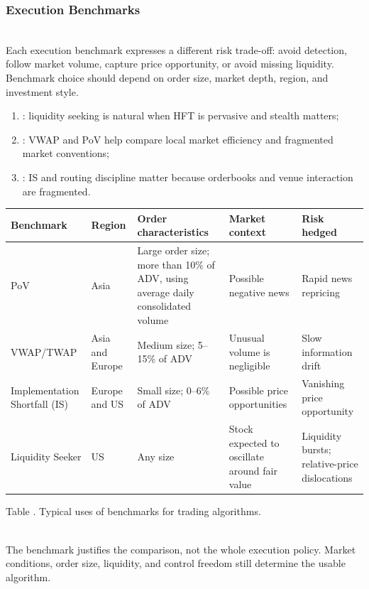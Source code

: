 \subsubsection{Execution Benchmarks}

\begin{principle} \\
Each execution benchmark expresses a different risk trade-off: avoid detection, follow market volume, capture price opportunity, or avoid missing liquidity. Benchmark choice should depend on order size, market depth, region, and investment style.
\end{principle}

\begin{taxonomy} 
\begin{enumerate}[label=\roman*.]
\setlength{\itemsep}{0pt}
\item {}: liquidity seeking is natural when HFT is pervasive and stealth matters;
\item {}: VWAP and PoV help compare local market efficiency and fragmented market conventions;
\item {}: IS and routing discipline matter because orderbooks and venue interaction are fragmented.
\end{enumerate}
\end{taxonomy}

\begin{table}[htbp]
\centering
\scriptsize
{}
\renewcommand{\arraystretch}{1.12}
\setlength{\tabcolsep}{4pt}
\begin{tabularx}{\textwidth}{@{}>{\RaggedRight\arraybackslash}p{} >{\RaggedRight\arraybackslash}p{} >{\RaggedRight\arraybackslash}p{} >{\RaggedRight\arraybackslash}p{} >{\RaggedRight\arraybackslash}X@{}}
\hline
\textbf{Benchmark} & \textbf{Region} & \textbf{Order characteristics} & \textbf{Market context} & \textbf{Risk hedged} \\
\hline
PoV & Asia & Large order size; more than 10\% of ADV, using average daily consolidated volume & Possible negative news & Rapid news repricing \\
VWAP/TWAP & Asia and Europe & Medium size; 5--15\% of ADV & Unusual volume is negligible & Slow information drift \\
Implementation Shortfall (IS) & Europe and US & Small size; 0--6\% of ADV & Possible price opportunities & Vanishing price opportunity \\
Liquidity Seeker & US & Any size & Stock expected to oscillate around fair value & Liquidity bursts; relative-price dislocations \\
\hline
\end{tabularx}

\vspace{0.25em}
{\footnotesize Table \thetable. Typical uses of benchmarks for trading algorithms.}
\end{table}

\begin{caveat} \\
The benchmark justifies the comparison, not the whole execution policy. Market conditions, order size, liquidity, and control freedom still determine the usable algorithm.
\end{caveat}
